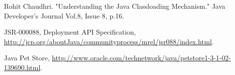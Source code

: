 \documentclass[conference]{IEEEtran}
\begin{document}
\begin{thebibliography}{9}

Rohit Chaudhri. "Understanding the Java Classloading Mechanism." Java Developer's Journal Vol.8, Issue 8, p.16.


JSR-000088, Deployment API Specification, \url{http://jcp.org/aboutJava/communityprocess/mrel/jsr088/index.html}.

Java Pet Store, \url{http://www.oracle.com/technetwork/java/petstore1-3-1-02-139690.html}.











\end{thebibliography}
\end{document}
